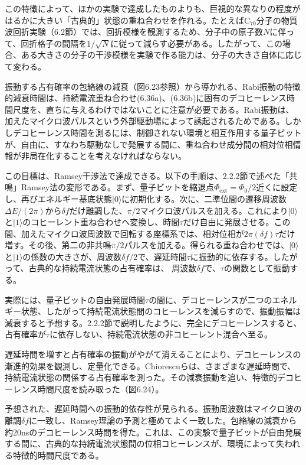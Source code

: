 この特徴によって、ほかの実験で達成したものよりも、巨視的な異なりの程度がはるかに大きい「古典的」状態の重ね合わせを作れる。たとえば$\mathrm C_{70}$分子の物質波回折実験（6.2節）では、回折模様を観測するため、分子中の原子数$N$に伴って、回折格子の間隔を$1/\sqrt N$に従って減らす必要がある。したがって、この場合、ある大きさの分子の干渉模様を実験で作る能力は、分子の大きさ自体に応じて変わる。

振動する占有確率の包絡線の減衰（図6.23参照）から導かれる、Rabi振動の特徴的減衰時間は、持続電流重ね合わせ(6.36a)、(6.36b)に固有のデコヒーレンス時間尺度を、直ちに与えるわけではないことに注意が必要である。Rabi振動は、加えたマイクロ波パルスという外部駆動場によって誘起されるためである。しかしデコヒーレンス時間を測るには、制御されない環境と相互作用する量子ビットが、自由に、すなわち駆動なしで発展する間に、重ね合わせ成分間の相対位相情報が非局在化することを考えなければならない。

この目標は、Ramsey干渉法\cite{ref051}で達成できる。以下の手順は、2.2.2節で述べた「共鳴」Ramsey法の変形である。まず、量子ビットを縮退点$\Phi_{\mathrm{ext}}=\Phi_0/2$近くに設定し、再びエネルギー基底状態$|0\rangle$に初期化する。次に、二準位間の遷移周波数$\Delta E/(2\pi)$から$\delta f$だけ離調した、$\pi/2$マイクロ波パルスを加える。これにより$|0\rangle$と$|1\rangle$のコヒーレント重ね合わせへ変換し、時間$\tau$だけ自由に発展させる。この間、加えたマイクロ波周波数で回転する座標系では、相対位相が$2\pi(\delta f)\tau$だけ増す。その後、第二の非共鳴$\pi/2$パルスを加える。得られる重ね合わせでは、$|0\rangle$と$|1\rangle$の係数の大きさが、周波数$\delta f/2$で、遅延時間$\tau$に振動的に依存する。したがって、古典的な持続電流状態の占有確率は、
\hypertarget{srcpage:280}{}\label{srcpage:280}
周波数$\delta f$で、$\tau$の関数として振動する。

実際には、量子ビットの自由発展時間$\tau$の間に、デコヒーレンスが二つのエネルギー状態、したがって持続電流状態間のコヒーレンスを減らすので、振動振幅は減衰すると予想する。2.2.2節で説明したように、完全にデコヒーレンスすると、占有確率が$\tau$に依存しない、持続電流状態の非コヒーレント混合へ至る。

遅延時間を増すと占有確率の振動がやがて消えることにより、デコヒーレンスの漸進的効果を観測し、定量化できる。Chiorescuら\cite{ref284}は、さまざまな遅延時間で、持続電流状態の関係する占有確率を測った。その減衰振動を追い、特徴的デコヒーレンス時間尺度を読み取った（図6.24）。

予想された、遅延時間への振動的依存性が見られる。振動周波数はマイクロ波の離調$\delta f$に一致し、Ramsey理論の予測と極めてよく一致した。包絡線の減衰から約20nsのデコヒーレンス時間を得た。これは、この実験で量子ビットが自由発展する間に、古典的な持続電流状態間の位相コヒーレンスが、環境によって失われる特徴的時間尺度である。

